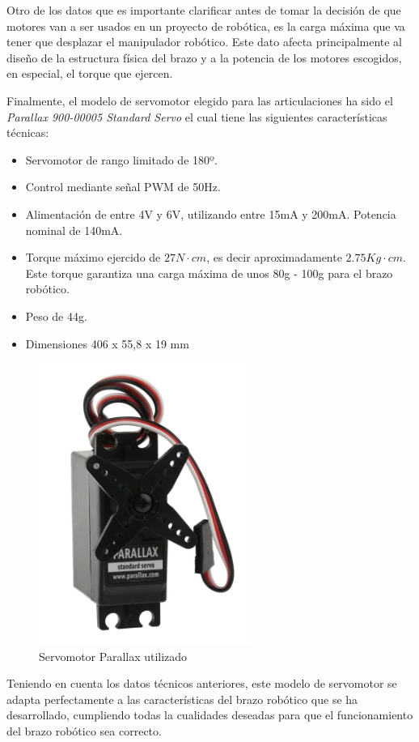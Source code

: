 Otro de los datos que es importante clarificar antes de tomar la decisión de que motores van a ser usados en un proyecto de robótica, es la carga máxima que va tener que desplazar el manipulador robótico. Este dato afecta principalmente al diseño de la estructura física del brazo y a la potencia de los motores escogidos, en especial, el torque que ejercen. 

Finalmente, el modelo de servomotor elegido para las articulaciones ha sido el \textit{Parallax 900-00005 Standard Servo} el cual tiene las siguientes características técnicas:

\begin{itemize}
    \item Servomotor de rango limitado de 180º.
    \item Control mediante señal PWM de 50Hz.
    \item Alimentación de entre 4V y 6V, utilizando entre 15mA y 200mA. Potencia nominal de 140mA.
    \item Torque máximo ejercido de $27N\cdot cm$, es decir aproximadamente $2.75 Kg\cdot cm$. Este torque garantiza una carga máxima de unos 80g - 100g para el brazo robótico.
    \item Peso de 44g.
    \item Dimensiones 406 x 55,8 x 19 mm
\end{itemize}

\begin{figure}[H]
    \centering 
    \includegraphics[width=.35\linewidth]{pictures/ServoParallax.PNG}
    \caption{Servomotor Parallax utilizado}
    \label{fig:}
\end{figure}

Teniendo en cuenta los datos técnicos anteriores, este modelo de servomotor se adapta perfectamente a las características del brazo robótico que se ha desarrollado, cumpliendo todas la cualidades deseadas para que el funcionamiento del brazo robótico sea correcto.